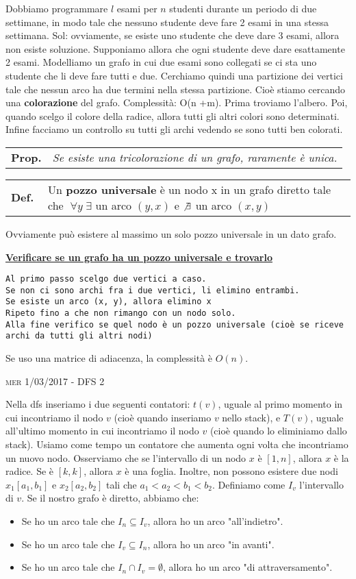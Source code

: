 \documentclass[a4paper,10pt]{article} %
\newcommand{\malgorithm}[1]{%
    {\bigbreak \par \hspace*{4pt} \underline{\textbf {#1}}}}
\newcommand{\msection}[1]{%
    {\newpage\bigbreak \bigbreak \par \hfil \huge \textsc {#1}}\par}
\renewcommand{\b}[1]{%
    {\textbf{#1}}}
\newcommand{\mdef}[1]{%
    {\smallbreak\par\begin{tabular}{ll} \textbf{Def.$\;\;$} & \begin{minipage}[t]{0.80\columnwidth}\normalsize  {#1}\end{minipage}\tabularnewline \end{tabular}}\smallskip\par}
\newcommand{\mprop}[1]{%
    {\smallbreak\par\begin{tabular}{ll} \textbf{Prop.} & \begin{minipage}[t]{0.8\columnwidth}\emph  {#1}\end{minipage}\tabularnewline \end{tabular}}\smallskip\par}
\begin{document}
Dobbiamo programmare $l$ esami per $n$ studenti durante un periodo di due settimane, in modo tale che nessuno studente deve fare 2 esami in una stessa settimana. Sol: ovviamente, se esiste uno studente che deve dare 3 esami, allora non esiste soluzione. Supponiamo allora che ogni studente deve dare esattamente 2 esami. Modelliamo un grafo in cui due esami sono collegati se ci sta uno studente che li deve fare tutti e due. Cerchiamo quindi una partizione dei vertici tale che nessun arco ha due termini nella stessa partizione. Cioè stiamo cercando una \b{colorazione} del grafo. Complessità: O(n +m). Prima troviamo l'albero. Poi, quando scelgo il colore della radice, allora tutti gli altri colori sono determinati. Infine facciamo un controllo su tutti gli archi vedendo se sono tutti ben colorati.

\mprop{Se esiste una tricolorazione di un grafo, raramente è unica.}

\mdef{Un \b{pozzo universale} è un nodo x in un grafo diretto tale che $\;\forall y \;\exists$ un arco $(y, x)$ e $\not \exists$ un arco $(x, y)$}
Ovviamente può esistere al massimo un solo pozzo universale in un dato grafo.

\malgorithm{Verificare se un grafo ha un pozzo universale e trovarlo}
\begin{lstlisting}
Al primo passo scelgo due vertici a caso.
Se non ci sono archi fra i due vertici, li elimino entrambi.
Se esiste un arco (x, y), allora elimino x
Ripeto fino a che non rimango con un nodo solo.
Alla fine verifico se quel nodo è un pozzo universale (cioè se riceve archi da tutti gli altri nodi)
\end{lstlisting}
Se uso una matrice di adiacenza, la complessità è $O(n)$.




\msection{mer 1/03/2017 - DFS 2}




Nella dfs inseriamo i due seguenti contatori: $t(v)$, uguale al primo momento in cui incontriamo il nodo $v$ (cioè quando inseriamo $v$ nello stack), e $T(v)$, uguale all'ultimo momento in cui incontriamo il nodo $v$ (cioè quando lo eliminiamo dallo stack). Usiamo come tempo un contatore che aumenta ogni volta che incontriamo un nuovo nodo. Osserviamo che se l'intervallo di un nodo $x$ è $[1, n]$, allora $x$ è la radice. Se è $[k, k]$, allora $x$ è una foglia. Inoltre, non possono esistere due nodi $x_1 [a_1, b_1]$ e $x_2 [a_2, b_2]$ tali che $a_1 < a_2 < b_1 < b_2$. Definiamo come $I_v$ l'intervallo di $v$. Se il nostro grafo è diretto, abbiamo che:
    \begin{itemize}
        \item Se ho un arco tale che $I_n \subseteq I_v$, allora ho un arco "all'indietro".
        \item Se ho un arco tale che $I_v \subseteq I_n$, allora ho un arco "in avanti".
        \item Se ho un arco tale che $I_n \cap I_v = \emptyset$, allora ho un arco "di attraversamento".
    \end{itemize}
\end{document}
